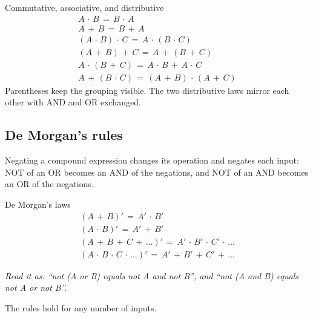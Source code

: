 \documentclass[11pt]{article}
\begin{document}
\begin{keepsection}
\begin{keepsection}
\begin{equationcard}{Commutative, associative, and distributive}
\[ \begin{gathered} {A}\, \cdot \, {B}\, =\, {B}\, \cdot \, {A} \\ {A}\, +\, {B}\, =\, {B}\, +\, {A} \\ ({A}\, \cdot \, {B})\, \cdot \, {C}\, =\, {A}\, \cdot \, ({B}\, \cdot \, {C}) \\ ({A}\, +\, {B})\, +\, {C}\, =\, {A}\, +\, ({B}\, +\, {C}) \\ {A}\, \cdot \, ({B}\, +\, {C})\, =\, {A}\, \cdot \, {B}\, +\, {A}\, \cdot \, {C} \\ {A}\, +\, ({B}\, \cdot \, {C})\, =\, ({A}\, +\, {B})\, \cdot \, ({A}\, +\, {C}) \end{gathered} \]
{\small Parentheses keep the grouping visible. The two distributive laws mirror each other with AND and OR exchanged.}
\end{equationcard}
\end{keepsection}

\begin{keepsection}
\subsection{De Morgan's rules}

Negating a compound expression changes its operation and negates each input: NOT of an OR becomes an AND of the negations, and NOT of an AND becomes an OR of the negations.

\begin{equationcard}{De Morgan's laws}
\[ \begin{gathered} ({A}\, +\, {B})'\, =\, {A}'\, \cdot \, {B}' \\ ({A}\, \cdot \, {B})'\, =\, {A}'\, +\, {B}' \\ ({A}\, +\, {B}\, +\, {C}\, +\, …)'\, =\, {A}'\, \cdot \, {B}'\, \cdot \, {C}'\, \cdot \, … \\ ({A}\, \cdot \, {B}\, \cdot \, {C}\, \cdot \, …)'\, =\, {A}'\, +\, {B}'\, +\, {C}'\, +\, … \end{gathered} \]
{\small \emph{Read it as: “not (A or B) equals not A and not B”, and “not (A and B) equals not A or not B”.}\par The rules hold for any number of inputs.}
\end{equationcard}


\end{keepsection}
\end{keepsection}
\end{document}
